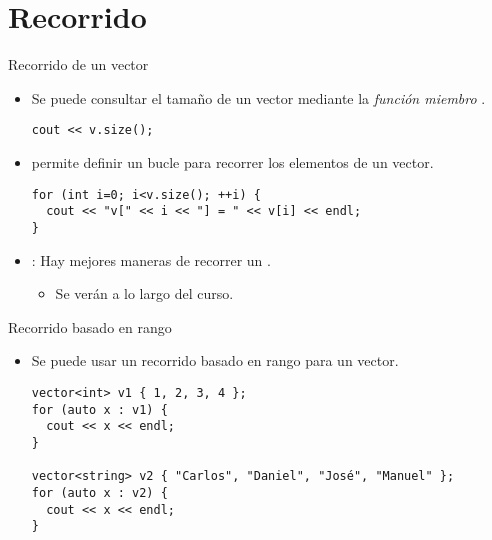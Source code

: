 \section{Recorrido}

\begin{frame}[fragile]{Recorrido de un vector}
\begin{itemize}
\item Se puede consultar el tamaño de un vector mediante la \emph{función miembro} .
\begin{lstlisting}
cout << v.size();
\end{lstlisting}
\item {} permite definir un bucle para recorrer los elementos de un vector.
\begin{lstlisting}
for (int i=0; i<v.size(); ++i) {
  cout << "v[" << i << "] = " << v[i] << endl;
}
\end{lstlisting}
  \item {}: Hay mejores maneras de recorrer un .
    \begin{itemize}
      \item Se verán a lo largo del curso.
    \end{itemize}
\end{itemize}
\end{frame}

\begin{frame}[t,fragile]{Recorrido basado en rango}
\begin{itemize}
  \item Se puede usar un recorrido basado en rango para un vector.
\begin{lstlisting}
vector<int> v1 { 1, 2, 3, 4 };
for (auto x : v1) {
  cout << x << endl;
}

vector<string> v2 { "Carlos", "Daniel", "José", "Manuel" };
for (auto x : v2) {
  cout << x << endl;
}
\end{lstlisting}
\end{itemize}
\end{frame}

